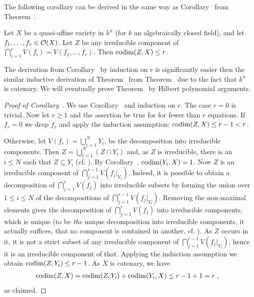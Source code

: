 \documentclass[a4paper,parskip=half,numbers=enddot, DIV=12]{scrreprt}
\begin{document}
The following corollary can be derived in the same way as Corollary~ from Theorem~.
\begin{cor}
    Let $X$ be a quasi-affine variety in $k^n$ (for $k$ an algebraically closed field), and let $f_1,\ldots,f_r\in \mathcal{O}(X)$. Let $Z$ be any irreducible component of $\bigcap_{i=1}^r V(f_i)=V(f_1,\ldots,f_r)$. Then $\operatorname{codim}(Z,X)\leq r$.
\end{cor}
The derivation from Corollary~ by induction on $r$ is significantly easier then the similar inductive derivation of Theorem~ from Theorem~ due to the fact that $k^n$ is catenary. We will eventually prove Theorem~ by Hilbert polynomial arguments.
\begin{proof}[Proof of Corollary~]
    We use Corollary~ and induction on $r$. The case $r=0$ is trivial. Now let $r\geq1$ and the assertion be true for for fewer than $r$ equations. If $f_r=0$ we drop $f_r$ and apply the induction assumption: $\operatorname{codim}(Z,X) \leq r-1< r $. 
    
    Otherwise, let $V(f_r) = \bigcup_{i=1}^N Y_i$, be the decomposition into irreducible components. Then $Z=\bigcup_{i=1}^N (Z\cap Y_i)$ and, as $Z$ is irreducible, there is an $i\leq N$ such that $Z\subseteq Y_i$ (cf. \cite[Proposition~2.1.1]{alg1}). By Corollary~, $\operatorname{codim}(Y_i,X) = 1$. Now $Z$ is an irreducible component of $ \bigcap_{j=1}^{r-1} V(f_j|_{Y_i})$. Indeed, it is possible to obtain a decomposition of $\bigcap_{j=1}^r V(f_j)$ into irreducible subsets by forming the union over $1\leq i\leq N$ of the decompositions of $ \bigcap_{j=1}^{r-1} V(f_j|_{Y_i})$. Removing the non-maximal elements gives the decomposition of $\bigcap_{j=1}^r V(f_j)$ into irreducible components, which is unique (to be \emph{the} unique decomposition into irreducible components, it actually suffices, that no component is contained in another, cf. \cite[Proposition~2.1.1]{alg1}). As $Z$ occurs in it, it is not a strict subset of any irreducible component of $\bigcap_{j=1}^{r-1} V(f_j|_{Y_i})$, hence it is an irreducible component of that. Applying the induction assumption we obtain $\operatorname{codim}(Z,Y_i)\leq r-1$. As $X$ is catenary, we have
    \begin{align*}
        \operatorname{codim}(Z,X) = \operatorname{codim}(Z,Y_i) +\operatorname{codim}(Y_i, X) \leq r-1+1 = r\;,
    \end{align*}
    as claimed.
\end{proof}
\end{document}
